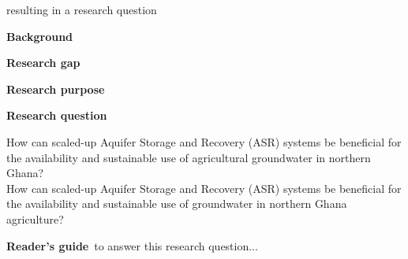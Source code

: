 resulting in a research question

\textbf{Background}\

\textbf{Research gap}\

\textbf{Research purpose}\

\textbf{Research question}\

How can scaled-up Aquifer Storage and Recovery (ASR) systems be beneficial for the availability and sustainable use of agricultural groundwater in northern Ghana? \\

How can scaled-up Aquifer Storage and Recovery (ASR) systems be beneficial for the availability and sustainable use of groundwater in northern Ghana agriculture?

\textbf{Reader's guide}\
to answer this research question... 
